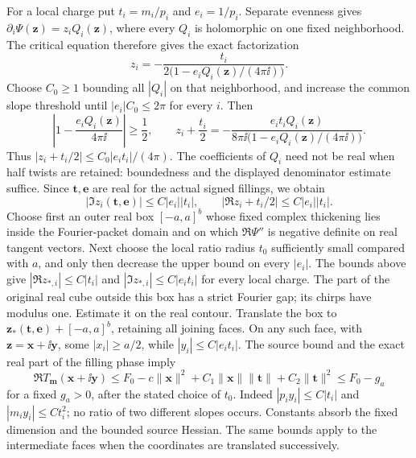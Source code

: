 For a local charge put $t_i=m_i/p_i$ and $e_i=1/p_i$. Separate evenness gives $\partial_i\Psi(\mathbf z)=z_iQ_i(\mathbf z)$, where every $Q_i$ is holomorphic on one fixed neighborhood. The critical equation therefore gives the exact factorization
\[
 z_i=-\frac{t_i}{2\bigl(1-e_iQ_i(\mathbf z)/(4\pi\ii)\bigr)}.
\]
Choose $C_0\ge1$ bounding all $|Q_i|$ on that neighborhood, and increase the common slope threshold until $|e_i|C_0\le2\pi$ for every $i$. Then
\[
 \left|1-\frac{e_iQ_i(\mathbf z)}{4\pi\ii}\right|\ge\frac12,
 \qquad
 z_i+\frac{t_i}{2}
 =-\frac{e_it_iQ_i(\mathbf z)}
 {8\pi\ii\bigl(1-e_iQ_i(\mathbf z)/(4\pi\ii)\bigr)}.
\]
Thus $|z_i+t_i/2|\le C_0|e_it_i|/(4\pi)$. The coefficients of $Q_i$ need not be real when half twists are retained: boundedness and the displayed denominator estimate suffice. Since $\mathbf t,\mathbf e$ are real for the actual signed fillings, we obtain
\[
 |\Im z_i(\mathbf t,\mathbf e)|\le C|e_i||t_i|,
 \qquad |\Re z_i+t_i/2|\le C|e_i||t_i|.
\]
Choose first an outer real box $[-a,a]^b$ whose fixed complex thickening
lies inside the Fourier-packet domain and on which
$\Re\Psi''$ is negative definite on real tangent vectors. Next choose
the local ratio radius $t_0$ sufficiently small compared with $a$, and
only then decrease the upper bound on every $|e_i|$. The bounds above
give $|\Re z_{*,i}|\le C|t_i|$ and
$|\Im z_{*,i}|\le C|e_it_i|$ for every local charge. The part of the original real cube outside this box has a strict
Fourier gap; its chirps have modulus one. Estimate it on the real
contour. Translate the box
to $\mathbf z_*(\mathbf t,\mathbf e)+[-a,a]^b$, retaining all joining
faces. On any such face, with $\mathbf z=\mathbf x+\ii\mathbf y$,
some $|x_i|\ge a/2$, while $|y_i|\le C|e_it_i|$. The source bound and
the exact real part of the filling phase imply
\[
 \Re T_{\mathbf m}(\mathbf x+\ii\mathbf y)
 \le F_0-c\|\mathbf x\|^2
       +C_1\|\mathbf x\|\|\mathbf t\|+C_2\|\mathbf t\|^2
 \le F_0-g_a
\]
for a fixed $g_a>0$, after the stated choice of $t_0$. Indeed
$|p_i y_i|\le C|t_i|$ and $|m_i y_i|\le C t_i^2$; no ratio of two
different slopes occurs. Constants absorb the fixed dimension and the
bounded source Hessian. The same bounds apply to the intermediate faces
when the coordinates are translated successively.

